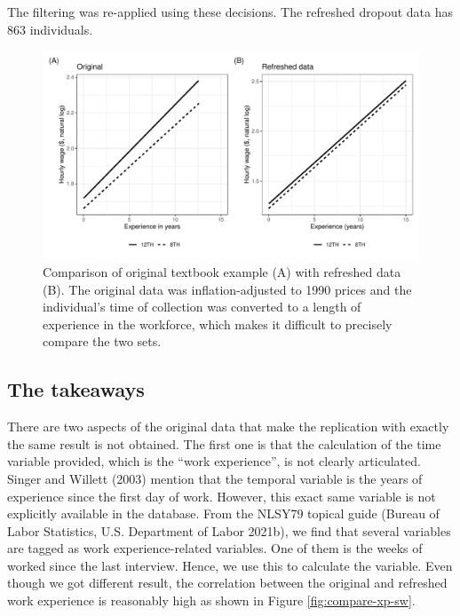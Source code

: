 \documentclass{article}
\begin{document}
The filtering was re-applied using these decisions. The refreshed dropout data has 863 individuals.

\begin{figure}

{\centering \includegraphics[width=1\linewidth]{figures/plotting-sw-do-1} 

}

\caption{Comparison of original textbook example (A) with refreshed data (B). The original data was inflation-adjusted to 1990 prices and the individual's time of collection was converted to a length of experience in the workforce, which makes it difficult to precisely compare the two sets.}\label{fig:plotting-sw-do}
\end{figure}

\hypertarget{takeaways}{%
\subsection{The takeaways}\label{takeaways}}

There are two aspects of the original data that make the replication with exactly the same result is not obtained. The first one is that the calculation of the time variable provided, which is the ``work experience'', is not clearly articulated. Singer and Willett (2003) mention that the temporal variable is the years of experience since the first day of work. However, this exact same variable is not explicitly available in the database. From the NLSY79 topical guide (Bureau of Labor Statistics, U.S. Department of Labor 2021b), we find that several variables are tagged as work experience-related variables. One of them is the weeks of worked since the last interview. Hence, we use this to calculate the variable. Even though we got different result, the correlation between the original and refreshed work experience is reasonably high as shown in Figure \ref{fig:compare-xp-sw}.
\end{document}
